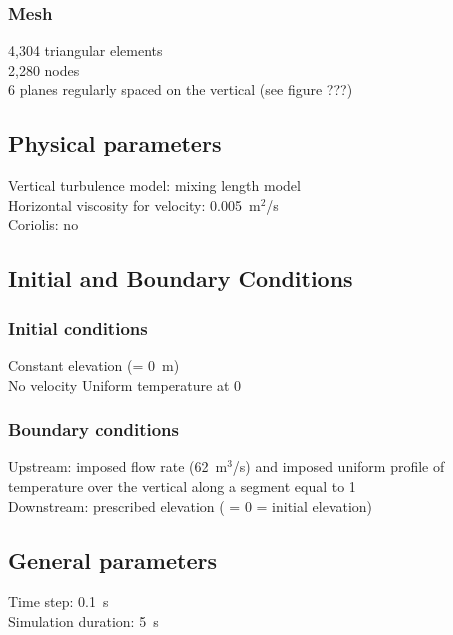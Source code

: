 \subsubsection{Mesh}
%
4,304 triangular elements\\
2,280 nodes\\
6 planes regularly spaced on the vertical (see figure ???)
%
%
%
\subsection{Physical parameters}
%
Vertical turbulence model: mixing length model\\
Horizontal viscosity for velocity: 0.005~m$^2$/s\\
Coriolis: no
%
%
%
%
%
%
\subsection{Initial and Boundary Conditions}
%
\subsubsection{Initial conditions}
%
Constant elevation (= 0~m)\\
No velocity
Uniform temperature at 0
%
\subsubsection{Boundary conditions}
%
Upstream: imposed flow rate (62~m$^3$/s)
and imposed uniform profile of temperature over the vertical along
a segment equal to 1\\
Downstream: prescribed elevation ( = 0 = initial elevation)
%
\subsection{General parameters}
%
Time step: 0.1~s\\
Simulation duration: 5~s
%
%
%
